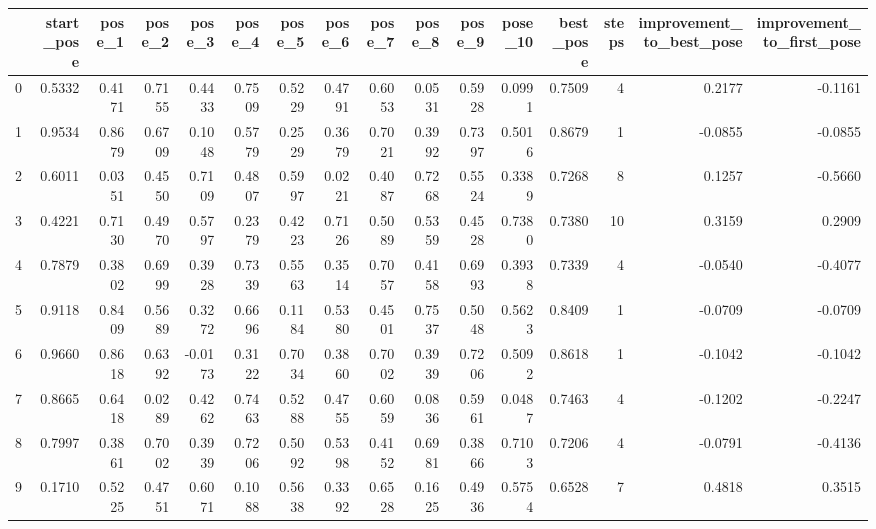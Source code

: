 \begin{tabular}{lrrrrrrrrrrrrrrr}
\toprule
{} &  start\_pose &  pose\_1 &  pose\_2 &  pose\_3 &  pose\_4 &  pose\_5 &  pose\_6 &  pose\_7 &  pose\_8 &  pose\_9 &  pose\_10 &  best\_pose &  steps &  improvement\_to\_best\_pose &  improvement\_to\_first\_pose \\
\midrule
0  &      0.5332 &  0.4171 &  0.7155 &  0.4433 &  0.7509 &  0.5229 &  0.4791 &  0.6053 &  0.0531 &  0.5928 &   0.0991 &     0.7509 &      4 &                    0.2177 &                    -0.1161 \\
1  &      0.9534 &  0.8679 &  0.6709 &  0.1048 &  0.5779 &  0.2529 &  0.3679 &  0.7021 &  0.3992 &  0.7397 &   0.5016 &     0.8679 &      1 &                   -0.0855 &                    -0.0855 \\
2  &      0.6011 &  0.0351 &  0.4550 &  0.7109 &  0.4807 &  0.5997 &  0.0221 &  0.4087 &  0.7268 &  0.5524 &   0.3389 &     0.7268 &      8 &                    0.1257 &                    -0.5660 \\
3  &      0.4221 &  0.7130 &  0.4970 &  0.5797 &  0.2379 &  0.4223 &  0.7126 &  0.5089 &  0.5359 &  0.4528 &   0.7380 &     0.7380 &     10 &                    0.3159 &                     0.2909 \\
4  &      0.7879 &  0.3802 &  0.6999 &  0.3928 &  0.7339 &  0.5563 &  0.3514 &  0.7057 &  0.4158 &  0.6993 &   0.3938 &     0.7339 &      4 &                   -0.0540 &                    -0.4077 \\
5  &      0.9118 &  0.8409 &  0.5689 &  0.3272 &  0.6696 &  0.1184 &  0.5380 &  0.4501 &  0.7537 &  0.5048 &   0.5623 &     0.8409 &      1 &                   -0.0709 &                    -0.0709 \\
6  &      0.9660 &  0.8618 &  0.6392 & -0.0173 &  0.3122 &  0.7034 &  0.3860 &  0.7002 &  0.3939 &  0.7206 &   0.5092 &     0.8618 &      1 &                   -0.1042 &                    -0.1042 \\
7  &      0.8665 &  0.6418 &  0.0289 &  0.4262 &  0.7463 &  0.5288 &  0.4755 &  0.6059 &  0.0836 &  0.5961 &   0.0487 &     0.7463 &      4 &                   -0.1202 &                    -0.2247 \\
8  &      0.7997 &  0.3861 &  0.7002 &  0.3939 &  0.7206 &  0.5092 &  0.5398 &  0.4152 &  0.6981 &  0.3866 &   0.7103 &     0.7206 &      4 &                   -0.0791 &                    -0.4136 \\
9  &      0.1710 &  0.5225 &  0.4751 &  0.6071 &  0.1088 &  0.5638 &  0.3392 &  0.6528 &  0.1625 &  0.4936 &   0.5754 &     0.6528 &      7 &                    0.4818 &                     0.3515 \\

\end{tabular}
